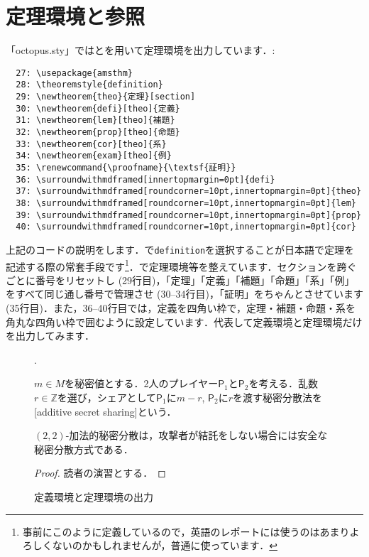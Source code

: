 \documentclass[uplatex]{jsreport}
\begin{document}
\section{定理環境と参照}\label{section:amsthm}
「octopus.sty」ではとを用いて定理環境を出力しています．:\par
\begin{verbatim}
  27: \usepackage{amsthm}
  28: \theoremstyle{definition}
  29: \newtheorem{theo}{定理}[section]
  30: \newtheorem{defi}[theo]{定義}
  31: \newtheorem{lem}[theo]{補題}
  32: \newtheorem{prop}[theo]{命題}
  33: \newtheorem{cor}[theo]{系}
  34: \newtheorem{exam}[theo]{例}
  35: \renewcommand{\proofname}{\textsf{証明}}
  36: \surroundwithmdframed[innertopmargin=0pt]{defi}
  37: \surroundwithmdframed[roundcorner=10pt,innertopmargin=0pt]{theo}
  38: \surroundwithmdframed[roundcorner=10pt,innertopmargin=0pt]{lem}
  39: \surroundwithmdframed[roundcorner=10pt,innertopmargin=0pt]{prop}
  40: \surroundwithmdframed[roundcorner=10pt,innertopmargin=0pt]{cor}
\end{verbatim}
\par
上記のコードの説明をします．で\texttt{definition}を選択することが日本語で定理を記述する際の常套手段です\footnote{事前にこのように定義しているので，英語のレポートには使うのはあまりよろしくないのかもしれませんが，普通に使っています．}．で定理環境等を整えています．セクションを跨ぐごとに番号をリセットし (29行目)，「定理」「定義」「補題」「命題」「系」「例」をすべて同じ通し番号で管理させ (30--34行目)，「証明」をちゃんとさせています (35行目)．また，36--40行目では，定義を四角い枠で，定理・補題・命題・系を角丸な四角い枠で囲むように設定しています．代表して定義環境と定理環境だけを出力してみます．
\par
\sukima
\begin{figure}[h]
  \centering
  \begin{minipage}{0.75\columnwidth}
    \sukima . \vspace{-\baselineskip}
    \begin{defi}\label{def:additiveSS}
      $m \in M$を秘密値とする．2人のプレイヤー$\mathsf{P}_1$と$\mathsf{P}_2$を考える．乱数$r \in \mathbb{Z}$を選び，シェアとして$\mathsf{P}_1$に$m - r$, $\mathsf{P}_2$に$r$を渡す秘密分散法を[additive secret sharing]という．
    \end{defi}
    \begin{theo}
      $(2,2)$-加法的秘密分散は，攻撃者が結託をしない場合には安全な秘密分散方式である．
    \end{theo}
    \begin{proof}
      読者の演習とする．
    \end{proof}
  \end{minipage}
  \caption{定義環境と定理環境の出力}
  \label{fig:1.defi-and-theo}
\end{figure}
\end{document}
